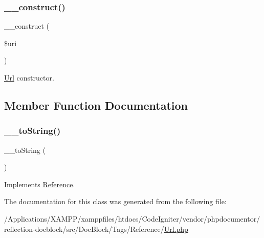 \subsubsection{\texorpdfstring{\+\_\+\+\_\+construct()}{\_\_construct()}}
{\footnotesize\ttfamily \+\_\+\+\_\+construct (\begin{DoxyParamCaption}\item[{}]{\$uri }\end{DoxyParamCaption})}

\mbox{\hyperlink{classphp_documentor_1_1_reflection_1_1_doc_block_1_1_tags_1_1_reference_1_1_url}{Url}} constructor. 

\subsection{Member Function Documentation}
\mbox{\label{classphp_documentor_1_1_reflection_1_1_doc_block_1_1_tags_1_1_reference_1_1_url_a7516ca30af0db3cdbf9a7739b48ce91d}} 
\subsubsection{\texorpdfstring{\+\_\+\+\_\+to\+String()}{\_\_toString()}}
{\footnotesize\ttfamily \+\_\+\+\_\+to\+String (\begin{DoxyParamCaption}{ }\end{DoxyParamCaption})}



Implements \mbox{\hyperlink{interfacephp_documentor_1_1_reflection_1_1_doc_block_1_1_tags_1_1_reference_1_1_reference_a7516ca30af0db3cdbf9a7739b48ce91d}{Reference}}.



The documentation for this class was generated from the following file\+:\begin{DoxyCompactItemize}
\item 
/\+Applications/\+X\+A\+M\+P\+P/xamppfiles/htdocs/\+Code\+Igniter/vendor/phpdocumentor/reflection-\/docblock/src/\+Doc\+Block/\+Tags/\+Reference/\mbox{\hyperlink{_url_8php}{Url.\+php}}\end{DoxyCompactItemize}

